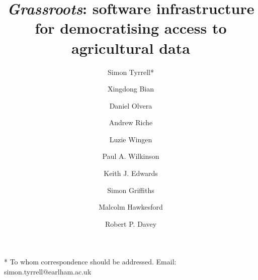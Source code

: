 \documentclass[9pt,a4paper]{extarticle}
\begin{document}
\pagestyle{front}

\title{\textit {Grassroots}: software infrastructure for democratising access to agricultural data}
\author[1]{Simon Tyrrell*}
\author[1]{Xingdong Bian}
\author[1]{Daniel Olvera}
\author[3]{Andrew Riche}
\author[4]{Luzie Wingen}
\author[2]{Paul A. Wilkinson}
\author[2]{Keith J. Edwards}
\author[4]{Simon Griffiths}
\author[3]{Malcolm Hawkesford}
\author[1]{Robert P. Davey}

\maketitle

* To whom correspondence should be addressed. Email: simon.tyrrell@earlham.ac.uk

\thispagestyle{front}

\end{document}

